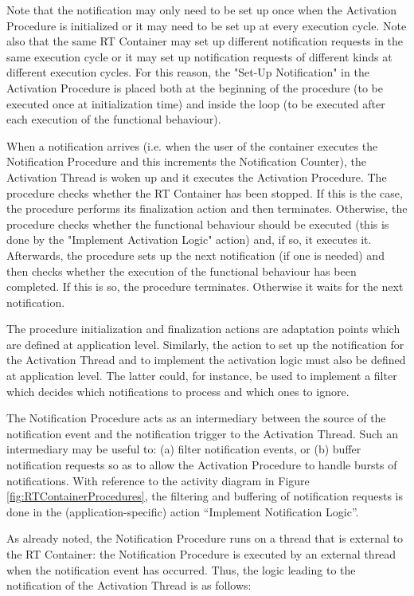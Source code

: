Note that the notification may only need to be set up once when the Activation Procedure is initialized or it may need to be set up at every execution cycle. Note also that the same RT Container may set up different notification requests in the same execution cycle or it may set up notification requests of different kinds at different execution cycles. For this reason, the "Set-Up Notification" in the Activation Procedure is placed both at the beginning of the procedure (to be executed once at initialization time) and inside the loop (to be executed after each execution of the functional behaviour).

When a notification arrives (i.e. when the user of the container executes the Notification Procedure and this increments the Notification Counter), the Activation Thread is woken up and it executes the Activation Procedure. The procedure checks whether the RT Container has been stopped. If this is the case, the procedure performs its finalization action and then terminates. Otherwise, the procedure checks whether the functional behaviour should be executed (this is done by the "Implement Activation Logic" action) and, if so, it executes it. Afterwards, the procedure sets up the next notification (if one is needed) and then checks whether the execution of the functional behaviour has been completed. If this is so, the procedure terminates. Otherwise it waits for the next notification.

The procedure initialization and finalization actions are adaptation points which are defined at application level. Similarly, the action to set up the notification for the Activation Thread and to implement the activation logic must also be defined at application level. The latter could, for instance, be used to implement a filter which decides which notifications to process and which ones to ignore.

The Notification Procedure acts as an intermediary
between the source of the notification event and the notification trigger to the Activation
Thread. Such an intermediary may be useful to: (a) filter notification events, or (b) buffer
notification requests so as to allow the Activation Procedure to handle bursts of notifications.
With reference to the activity diagram in Figure \ref{fig:RTContainerProcedures}, the filtering 
and buffering of notification requests is done in the (application-specific) action “Implement Notification Logic”.

As already noted, the Notification Procedure runs on a thread that is external to the RT
Container: the Notification Procedure is executed by an external thread when the notification
event has occurred. Thus, the logic leading to the notification of the Activation Thread is as
follows:

